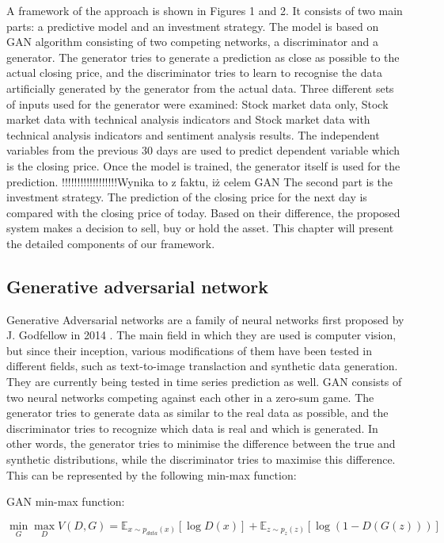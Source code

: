 \documentclass[11pt]{article} %
\begin{document}
A framework of the approach is shown in Figures 1 and 2. It consists of two main parts: a predictive model and an investment strategy. The model is based on GAN algorithm consisting of two competing networks, a discriminator and a generator. The generator tries to generate a prediction as close as possible to the actual closing price, and the discriminator tries to learn to recognise the data artificially generated by the generator from the actual data. Three different sets of inputs used for the generator were examined: Stock market data only, Stock market data with technical analysis indicators and Stock market data with technical analysis indicators and sentiment analysis results. The independent variables from the previous 30 days are used to predict dependent variable which is the closing price. Once the model is trained, the generator itself is used for the prediction. !!!!!!!!!!!!!!!!!!Wynika to z faktu, iż celem GAN  The second part is the investment strategy. The prediction of the closing price for the next day is compared with the closing price of today. Based on their difference, the proposed system makes a decision to sell, buy or hold the asset. This chapter will present the detailed components of our framework. 

\subsection{Generative adversarial network}

Generative Adversarial networks are a family of neural networks first proposed by J. Godfellow in 2014 \cite{gan1}. The main field in which they are used is computer vision, but since their inception, various modifications of them have been tested in different fields, such as text-to-image translaction and synthetic data generation. They are currently being tested in time series prediction as well.  GAN consists of two neural networks competing against each other in a zero-sum game. The generator tries to generate data as similar to the real data as possible, and the discriminator tries to recognize which data is real and which is generated. In other words, the generator tries to minimise the difference between the true and synthetic distributions, while the discriminator tries to maximise this difference. This can be represented by the following min-max function: 

\begin{center}   GAN min-max function: \end{center}
\begin{equation} \min_G \max_D V(D, G)=
\mathbb{E}_{x\sim p_{data}(x)}[\log D(x)]
+ \mathbb{E}_{z\sim p_z(z)}[\log(1 - D(G(z)))] \end{equation}\\
\end{document}
